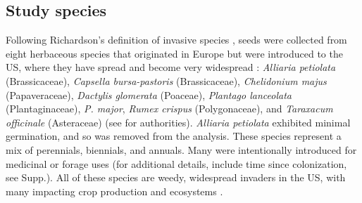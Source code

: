 \documentclass[11pt]{article}\usepackage[]{graphicx}\usepackage[]{color}
\begin{document}
	\subsection{Study species}
	Following Richardson's definition of invasive species \parencite[][, see Supp. for details]{Richardson2000, Richardson2011}, seeds were collected from eight herbaceous species that originated in Europe but were introduced to the US, where they have spread and become very widespread  \parencite{Uva1997}:\textit{ Alliaria petiolata} (Brassicaceae), \textit{Capsella bursa-pastoris} (Brassicaceae), \textit{Chelidonium majus} (Papaveraceae), \textit{Dactylis glomerata} (Poaceae),  \textit{Plantago lanceolata} (Plantaginaceae), \textit{P.  major}, \textit{Rumex crispus} (Polygonaceae), and \textit{Taraxacum officinale} (Asteraceae) (see \textcite{Haines2011} for authorities). \textit{Alliaria petiolata} exhibited minimal germination, and so was removed from the analysis. These species represent a mix of perennials, biennials, and annuals. Many were intentionally introduced for medicinal or forage uses (for additional details, include time since colonization, see Supp.).  All of these species are weedy, widespread invaders in the US, with many impacting crop production and ecosystems \parencite[e.g.,][]{Froese2003,Wolfe2008}. 
\end{document}
